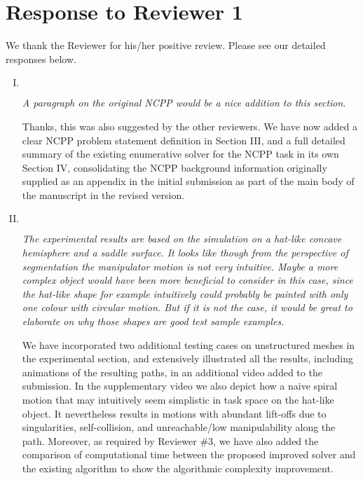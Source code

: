 \documentclass[11pt]{article}
\newenvironment{reviewer}
{\begin{mdframed}[roundcorner = 10pt,fontcolor=blue!70!black]\itshape}
{\end{mdframed}}
\begin{document}
\section*{Response to Reviewer 1}
We thank the Reviewer for his/her positive review. 
Please see our detailed responses below.

\begin{enumerate}[I.]

 \item $ $
  \begin{reviewer}
    A paragraph on the original NCPP would be a nice addition to this section.  
  \end{reviewer}

\noindent
Thanks, this was also suggested by the other reviewers. We have now added a clear NCPP problem statement definition in Section III, and a full detailed summary of the existing enumerative solver for the NCPP task in its own Section IV, consolidating the NCPP background information originally supplied as an appendix in the initial submission as part of the main body of the manuscript in the revised version.
  
  \item $ $
  \begin{reviewer}
   The experimental results are based on the simulation on a hat-like concave hemisphere and a saddle surface. It looks like though from the perspective of segmentation the manipulator motion is not very intuitive. Maybe a more complex object would have been more beneficial to consider in this case, since the hat-like shape for example intuitively could probably be painted with only one colour with circular motion. But if it is not the case, it would be great to elaborate on why those shapes are good test sample examples. 
  \end{reviewer}

\noindent
We have incorporated two additional testing cases on unstructured meshes in the experimental section, and extensively illustrated all the results, including animations of the resulting paths, in an additional video added to the submission. 
In the supplementary video we also depict how a naive spiral motion that may intuitively seem simplistic in task space on the hat-like object. 
It nevertheless results in motions with abundant lift-offs due to singularities, self-collision, and unreachable/low manipulability along the path.
Moreover, as required by Reviewer \#3, we have also added the comparison of computational time between the proposed improved solver and the existing algorithm to show the algorithmic complexity improvement. 


\end{enumerate}
\end{document}
